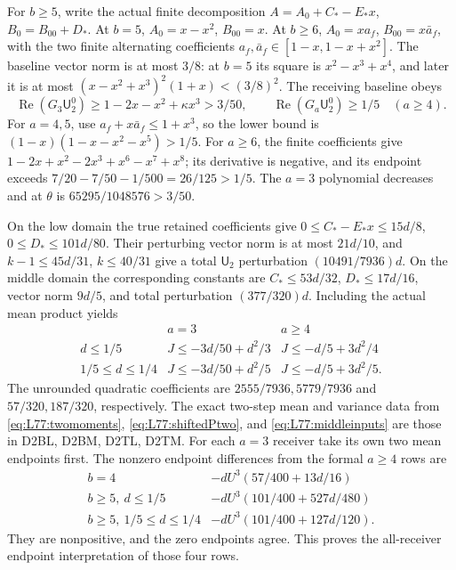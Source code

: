 For \(b\ge5\), write the actual finite decomposition
\(A=A_0+C_*-E_*x\), \(B_0=B_{00}+D_*\).
At \(b=5\), \(A_0=x-x^2\), \(B_{00}=x\).
At \(b\ge6\), \(A_0=xa_f\), \(B_{00}=x\bar a_f\), with
the two finite alternating coefficients
\(a_f,\bar a_f\in[1-x,1-x+x^2]\).
The baseline vector norm is at most \(3/8\): at \(b=5\)
its square is \(x^2-x^3+x^4\), and later it is at most
\((x-x^2+x^3)^2(1+x)<(3/8)^2\).
The receiving baseline obeys
\[
 \operatorname{Re}(G_3\mathsf U_2^0)
 \ge1-2x-x^2+\kappa x^3>3/50,\qquad
 \operatorname{Re}(G_a\mathsf U_2^0)\ge1/5\quad(a\ge4).
\]
For \(a=4,5\), use \(a_f+x\bar a_f\le1+x^3\), so the
lower bound is \((1-x)(1-x-x^2-x^5)>1/5\).
For \(a\ge6\), the finite coefficients give
\(1-2x+x^2-2x^3+x^6-x^7+x^8\); its derivative is negative,
and its endpoint exceeds
\(7/20-7/50-1/500=26/125>1/5\).
The \(a=3\) polynomial decreases and at \(\theta\) is
\(65295/1048576>3/50\).

On the low domain the true retained coefficients give
\(0\le C_*-E_*x\le15d/8\), \(0\le D_*\le101d/80\).
Their perturbing vector norm is at most \(21d/10\), and
\(k-1\le45d/31\), \(k\le40/31\) give a total
\(\mathsf U_2\) perturbation \((10491/7936)d\).
On the middle domain the corresponding constants are
\(C_*\le53d/32\), \(D_*\le17d/16\), vector norm
\(9d/5\), and total perturbation \((377/320)d\).
Including the actual mean product yields
\[
 \begin{array}{c|cc}
 &a=3&a\ge4\\\hline
 d\le1/5&J\le-3d/50+d^2/3&J\le-d/5+3d^2/4\\
 1/5\le d\le1/4&J\le-3d/50+d^2/5&J\le-d/5+3d^2/5.
 \end{array}
\]
The unrounded quadratic coefficients are \(2555/7936,5779/7936\)
and \(57/320,187/320\), respectively.
The exact two-step mean and variance data from
\eqref{eq:L77:twomoments}, \eqref{eq:L77:shiftedPtwo}, and
\eqref{eq:L77:middleinputs} are those in D2BL, D2BM, D2TL, D2TM.
For each \(a=3\) receiver take its own two mean endpoints first.
The nonzero endpoint differences from the formal \(a\ge4\) rows are
\[
 \begin{array}{c|c}
 b=4&-dU^3(57/400+13d/16)\\
 b\ge5,\ d\le1/5&-dU^3(101/400+527d/480)\\
 b\ge5,\ 1/5\le d\le1/4&-dU^3(101/400+127d/120).
 \end{array}
\]
They are nonpositive, and the zero endpoints agree. This proves
the all-receiver endpoint interpretation of those four rows.

